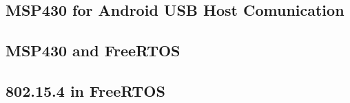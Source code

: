 		\subsection{MSP430 for Android USB Host Comunication}


		\subsection{MSP430 and FreeRTOS}	
		
	
		\subsection{802.15.4 in FreeRTOS}

